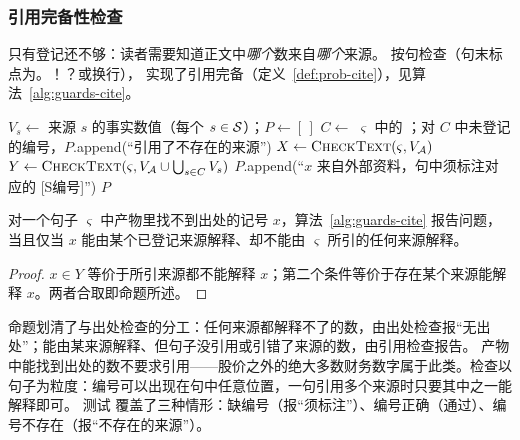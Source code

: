 \subsubsection{引用完备性检查}

只有登记还不够：读者需要知道正文中\emph{哪个}数来自\emph{哪个}来源。 按句检查（句末标点为。！？或换行），
实现了引用完备（定义~\ref{def:prob-cite}），见算法~\ref{alg:guards-cite}。

\begin{algorithm}[t]
\caption{外部数字的引用检查（）}
\label{alg:guards-cite}
\begin{algorithmic}[1]
  \State $V_s\gets$ 来源 $s$ 的事实数值（每个 $s\in\mathcal{S}$）；$P\gets[\,]$
    \State $C\gets$ $\varsigma$ 中的 \code{[S编号]}；对 $C$ 中未登记的编号，$P$.append(“引用了不存在的来源”)
    \State $X\gets\textsc{CheckText}(\varsigma, V_{\mathcal{A}})$
    \State $Y\gets\textsc{CheckText}(\varsigma, V_{\mathcal{A}}\cup\bigcup_{s\in C}V_s)$
        \State $P$.append(“$x$ 来自外部资料，句中须标注对应的 [S编号]”)
      \EndIf
    \EndFor
  \EndFor
  \State \Return $P$
\EndFunction
\end{algorithmic}
\end{algorithm}

\begin{proposition}[引用检查的判定]
\label{prop:guards-cite}
对一个句子 $\varsigma$ 中产物里找不到出处的记号 $x$，算法~\ref{alg:guards-cite} 报告问题，当且仅当 $x$ 能由某个已登记来源解释、却不能由 $\varsigma$ 所引的任何来源解释。
\end{proposition}
\begin{proof}
$x\in Y$ 等价于所引来源都不能解释 $x$；第二个条件等价于存在某个来源能解释 $x$。两者合取即命题所述。
\end{proof}

命题划清了与出处检查的分工：任何来源都解释不了的数，由出处检查报“无出处”；能由某来源解释、但句子没引用或引错了来源的数，由引用检查报告。
产物中能找到出处的数不要求引用——股价之外的绝大多数财务数字属于此类。检查以句子为粒度：编号可以出现在句中任意位置，一句引用多个来源时只要其中之一能解释即可。
测试  覆盖了三种情形：缺编号（报“须标注”）、编号正确（通过）、编号不存在（报“不存在的来源”）。

